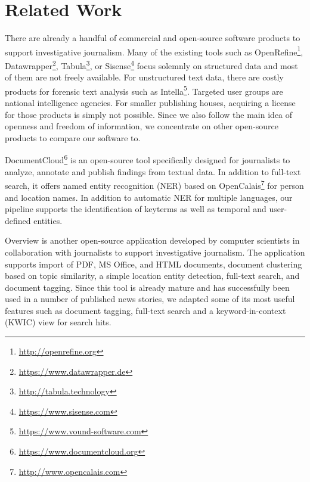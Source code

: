 \documentclass[11pt,a4paper]{article}
\begin{document}
\section{Related Work}
\label{related}
There are already a handful of commercial and open-source software products to support investigative journalism. Many of the existing tools such as OpenRefine\footnote{\url{http://openrefine.org}}, Datawrapper\footnote{\url{https://www.datawrapper.de}}, Tabula\footnote{\url{http://tabula.technology}}, or Sisense\footnote{\url{https://www.sisense.com}} focus solemnly on structured data and most of them are not freely available. 
For unstructured text data, there are costly products for forensic text analysis such as Intella\footnote{\url{https://www.vound-software.com}}. Targeted user groups are national intelligence agencies. For smaller publishing houses, acquiring a license for those products is simply not possible.
Since we also follow the main idea of openness and freedom of information, we concentrate on other open-source products to compare our software to.

DocumentCloud\footnote{\url{https://www.documentcloud.org}} is an open-source tool specifically designed for journalists to analyze, annotate and publish findings from textual data. In addition to full-text search, it offers named entity recognition (NER) based on OpenCalais\footnote{\url{http://www.opencalais.com}} for person and location names. In addition to automatic NER for multiple languages, our pipeline supports the identification of keyterms as well as temporal and user-defined entities.

Overview \cite{Brehmer2014} is another open-source application developed by computer scientists in collaboration with journalists to support investigative journalism. The application supports import of PDF, MS Office, and HTML documents, document clustering based on topic similarity, a simple location entity detection, full-text search, and document tagging. Since this tool is already mature and has successfully been used in a number of published news stories, we adapted some of its most useful features such as document tagging, full-text search and a keyword-in-context (KWIC) view for search hits. %
\end{document}
